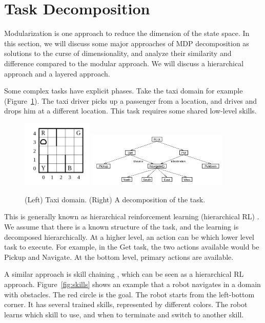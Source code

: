 \section{Task Decomposition}

Modularization is one approach to reduce the dimension of the state space. In
this section, we will discuss some major approaches of MDP decomposition as
solutions to the curse of dimensionality, and analyze their similarity and
difference compared to the modular approach. We will discuss a hierarchical
approach and a layered approach.

Some complex tasks have explicit phases. Take the taxi domain for example
(Figure~\ref{fig:taxi}). The taxi driver picks up a passenger from a location,
and drives and drops him at a different location. This task requires some shared
low-level skills.

\begin{figure}[h]
\centering
\includegraphics[width=0.3\textwidth]{taxi.png}
\includegraphics[width=0.6\textwidth]{maxq.png}
\caption{(Left) Taxi domain. (Right) A decomposition of the task.}
\label{fig:taxi}
\end{figure}

This is generally known as hierarchical reinforcement learning (hierarchical RL)
\cite{dietterich2000hierarchical}.
We assume that there is a known structure of the task, and the
learning is decomposed hierarchically. At a higher level, an action can be
which lower level task to execute. For example, in the Get task, the two actions
available would be Pickup and Navigate. At the bottom level, primary actions are
available.

A similar approach is skill chaining \cite{konidaris2009skill}, which can
be seen as a hierarchical RL approach. Figure~\ref{fig:skills} shows
an example that a robot navigates in a domain with obstacles. The red circle is
the goal. The robot starts from the left-bottom corner. It has several trained
skills, represented by different colors. The robot learns which skill to use,
and when to terminate and switch to another skill.

